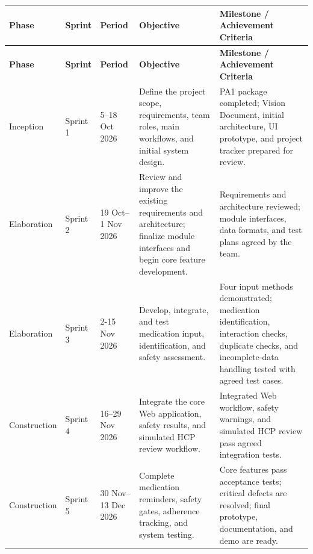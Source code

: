 \begin{longtable}{|
    L{0.13\textwidth}|
    L{0.13\textwidth}|
    L{0.17\textwidth}|
    L{0.23\textwidth}|
    L{0.24\textwidth}|
}
\hline

\textbf{Phase} &
\textbf{Sprint} &
\textbf{Period} &
\textbf{Objective} &
\textbf{Milestone / Achievement Criteria}
\\ \hline

\endfirsthead

\hline
\textbf{Phase} &
\textbf{Sprint} &
\textbf{Period} &
\textbf{Objective} &
\textbf{Milestone / Achievement Criteria}
\\ \hline

\endhead

Inception
& Sprint 1
& 5--18 Oct 2026
& Define the project scope, requirements,
team roles, main workflows, and initial system design.
& PA1 package completed; Vision Document,
initial architecture, UI prototype,
and project tracker prepared for review.
\\ \hline

Elaboration
& Sprint 2
& 19 Oct--1 Nov 2026
& Review and improve the existing requirements
and architecture; finalize module interfaces
and begin core feature development.
& Requirements and architecture reviewed;
module interfaces, data formats,
and test plans agreed by the team.
\\ \hline

Elaboration
& Sprint 3
& 2-15 Nov 2026
& Develop, integrate, and test medication input,
identification, and safety assessment.
& Four input methods demonstrated;
medication identification, interaction checks,
duplicate checks, and incomplete-data handling
tested with agreed test cases.
\\ \hline

Construction
& Sprint 4
& 16--29 Nov 2026
& Integrate the core Web application,
safety results, and simulated HCP review workflow.
& Integrated Web workflow, safety warnings,
and simulated HCP review pass agreed
integration tests.
\\ \hline

Construction
& Sprint 5
& 30 Nov--13 Dec 2026
& Complete medication reminders,
safety gates, adherence tracking,
and system testing.
& Core features pass acceptance tests;
critical defects are resolved;
final prototype, documentation,
and demo are ready.
\\ \hline

\end{longtable}



